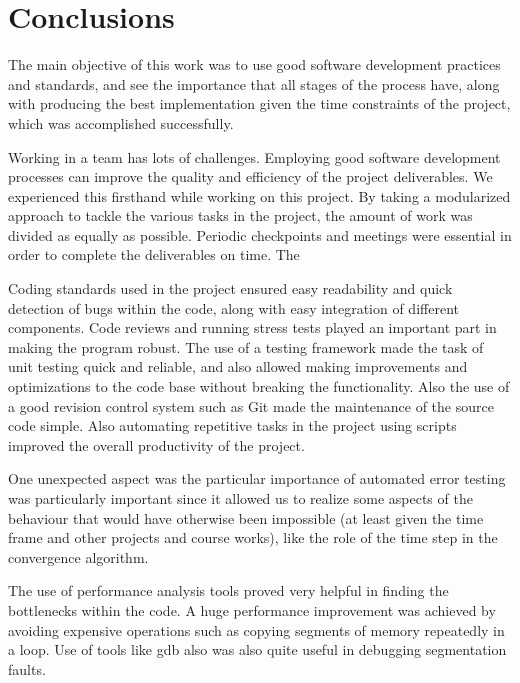 \documentclass[12pt,a4paper]{article}
\begin{document}
%			
%
%

\clearpage

\section{Conclusions}

The main objective of this work was to use good software development practices and standards, and see the importance that all stages of the process have, along with producing the best implementation given the time constraints of the project, which was accomplished successfully. 

Working in a team has lots of challenges. Employing good software development processes can improve the quality and efficiency of the project deliverables. We experienced this firsthand while working on this project. By taking a modularized approach to tackle the various tasks in the project, the amount of work was divided as equally as possible. Periodic checkpoints and meetings were essential in order to complete the deliverables on time. The

Coding standards used in the project ensured easy readability and quick detection of bugs within the code, along with easy integration of different components. Code reviews and running stress tests played an important part in making the program robust. The use of a testing framework made the task of unit testing quick and reliable, and also allowed making improvements and optimizations to the code base without breaking the functionality. Also the use of a good revision control system such as Git made the maintenance of the source code simple. Also automating repetitive tasks in the project using scripts improved the overall productivity of the project.
 
One unexpected aspect was the particular importance of automated error testing was particularly important since it  allowed us to realize some aspects of the behaviour that would have otherwise been impossible (at least given the time frame and other projects and course works), like the role of the time step in the convergence algorithm.

The use of performance analysis tools proved very helpful in finding the bottlenecks within the code. A huge performance improvement was achieved by avoiding expensive operations such as copying segments of memory repeatedly in a loop. Use of tools like gdb also was also quite useful in debugging segmentation faults.
\end{document}
